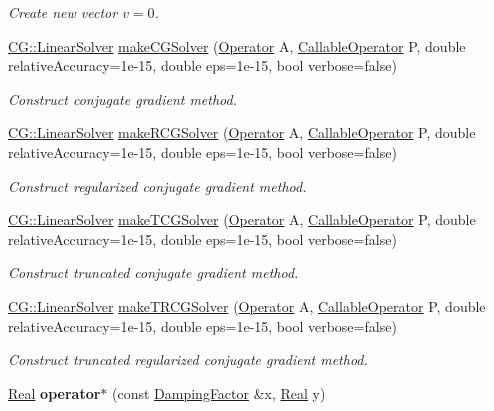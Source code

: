 \begin{DoxyCompactItemize}
\begin{DoxyCompactList}\small\item\em Create new vector $v=0$. \end{DoxyCompactList}\item 
\hyperlink{classSpacy_1_1CG_1_1LinearSolver}{C\+G\+::\+Linear\+Solver} \hyperlink{namespaceSpacy_aafd9bf87164dd48991d2016aec8bad08}{make\+C\+G\+Solver} (\hyperlink{classSpacy_1_1Operator}{Operator} A, \hyperlink{namespaceSpacy_a022a87afa759e18781dd2aea9a80cd73}{Callable\+Operator} P, double relative\+Accuracy=1e-\/15, double eps=1e-\/15, bool verbose=false)
\begin{DoxyCompactList}\small\item\em Construct conjugate gradient method. \end{DoxyCompactList}\item 
\hyperlink{classSpacy_1_1CG_1_1LinearSolver}{C\+G\+::\+Linear\+Solver} \hyperlink{namespaceSpacy_af9ddae62858412fe5309d11aac7b8ed3}{make\+R\+C\+G\+Solver} (\hyperlink{classSpacy_1_1Operator}{Operator} A, \hyperlink{namespaceSpacy_a022a87afa759e18781dd2aea9a80cd73}{Callable\+Operator} P, double relative\+Accuracy=1e-\/15, double eps=1e-\/15, bool verbose=false)
\begin{DoxyCompactList}\small\item\em Construct regularized conjugate gradient method. \end{DoxyCompactList}\item 
\hyperlink{classSpacy_1_1CG_1_1LinearSolver}{C\+G\+::\+Linear\+Solver} \hyperlink{namespaceSpacy_a5693f62a60708a49f51cf451991b96ec}{make\+T\+C\+G\+Solver} (\hyperlink{classSpacy_1_1Operator}{Operator} A, \hyperlink{namespaceSpacy_a022a87afa759e18781dd2aea9a80cd73}{Callable\+Operator} P, double relative\+Accuracy=1e-\/15, double eps=1e-\/15, bool verbose=false)
\begin{DoxyCompactList}\small\item\em Construct truncated conjugate gradient method. \end{DoxyCompactList}\item 
\hyperlink{classSpacy_1_1CG_1_1LinearSolver}{C\+G\+::\+Linear\+Solver} \hyperlink{namespaceSpacy_a66f5afbc97e887274b28be9c94aa3103}{make\+T\+R\+C\+G\+Solver} (\hyperlink{classSpacy_1_1Operator}{Operator} A, \hyperlink{namespaceSpacy_a022a87afa759e18781dd2aea9a80cd73}{Callable\+Operator} P, double relative\+Accuracy=1e-\/15, double eps=1e-\/15, bool verbose=false)
\begin{DoxyCompactList}\small\item\em Construct truncated regularized conjugate gradient method. \end{DoxyCompactList}\item 
\hyperlink{classSpacy_1_1Real}{Real} {\bfseries operator$\ast$} (const \hyperlink{classSpacy_1_1DampingFactor}{Damping\+Factor} \&x, \hyperlink{classSpacy_1_1Real}{Real} y)\hypertarget{namespaceSpacy_a0194ea02f9d53e7145ac497c99eadbe0}{}\label{namespaceSpacy_a0194ea02f9d53e7145ac497c99eadbe0}


\end{DoxyCompactItemize}
